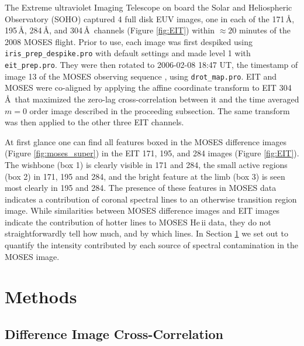		The Extreme ultraviolet Imaging Telescope \citep[EIT:][]{EIT} on board the Solar and Heliospheric Observatory (SOHO) captured 4 full disk EUV images, one in each of the 171\,\AA, 195\,\AA, 284\,\AA, and 304\,\AA\ channels (Figure \ref{fig:EIT}) within $\approx20$ minutes of the 2008 MOSES flight.
		Prior to use, each image was first despiked using \texttt{iris\_prep\_despike.pro} with default settings and made level 1 with \texttt{eit\_prep.pro}. 
		They were then rotated to 2006-02-08 18:47 UT, the timestamp of image 13 of the MOSES observing sequence \citep{Fox2011}, using \texttt{drot\_map.pro}.
		EIT and MOSES were co-aligned by applying the affine coordinate transform to EIT 304\,\AA\ that maximized the zero-lag cross-correlation between it and the time averaged $m=0$ order image described in the proceeding subsection.
		The same transform was then applied to the other three EIT channels.
	 
		At first glance one can find all features boxed in the MOSES difference images (Figure \ref{fig:moses_super}) in the EIT 171, 195, and 284 images (Figure \ref{fig:EIT}).
		The wishbone (box 1) is clearly visible in 171 and 284, the small active regions (box 2) in 171, 195 and 284, and the bright feature at the limb (box 3) is seen most clearly in 195 and 284.
		The presence of these features in MOSES data indicates a contribution of coronal spectral lines to an otherwise transition region image.  
		While similarities between MOSES difference images and EIT images indicate the contribution of hotter lines to MOSES He\,{\sc ii} data, they do not straightforwardly tell how much, and by which lines.  
		In Section \ref{sec:methods} we set out to quantify the intensity contributed by each source of spectral contamination in the MOSES image.
		
		
\section{Methods}\label{sec:methods}
 	\subsection{Difference Image Cross-Correlation}\label{sec:crosscorrelation}
 	
